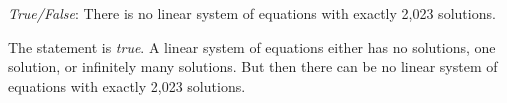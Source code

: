 \documentclass[11pt,letterpaper]{article}
\begin{document}
\quizsol \textit{True/False}: There is no linear system of equations with exactly 2,023 solutions. \pspace

\sol The statement is \textit{true}. A linear system of equations either has no solutions, one solution, or infinitely many solutions. But then there can be no linear system of equations with exactly 2,023 solutions.  
\end{document}
